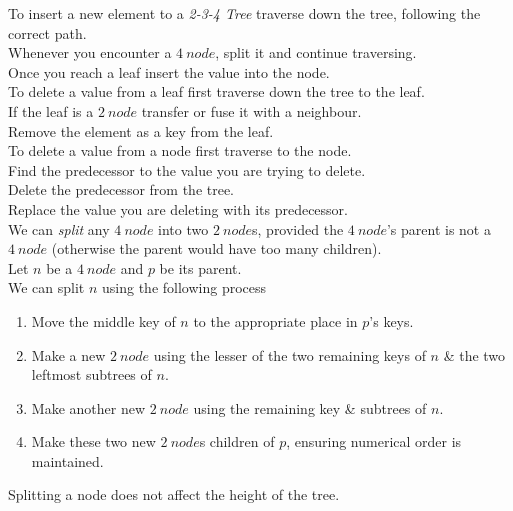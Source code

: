 \documentclass[11pt,a4paper]{article}
\begin{document}
To insert a new element to a \textit{2-3-4 Tree} traverse down the tree, following the correct path.\\
Whenever you encounter a $4\ node$, split it and continue traversing.\\
Once you reach a leaf insert the value into the node.\\

To delete a value from a leaf first traverse down the tree to the leaf.\\
If the leaf is a $2\ node$ transfer or fuse it with a neighbour.\\
Remove the element as a key from the leaf.\\

To delete a value from a node first traverse to the node.\\
Find the predecessor to the value you are trying to delete.\\
Delete the predecessor from the tree.\\
Replace the value you are deleting with its predecessor.\\

We can \textit{split} any $4\ node$ into two $2\ node$s, provided the $4\ node$'s parent is not a $4\ node$ (otherwise the parent would have too many children).\\
Let $n$ be a $4\ node$ and $p$ be its parent.\\
We can split $n$ using the following process
\begin{enumerate}
  \item Move the middle key of $n$ to the appropriate place in $p$'s keys.
  \item Make a new $2\ node$ using the lesser of the two remaining keys of $n$ \& the two leftmost subtrees of $n$.
  \item Make another new $2\ node$ using the remaining key \& subtrees of $n$.
  \item Make these two new $2\ node$s children of $p$, ensuring numerical order is maintained.
\end{enumerate}
\nb Splitting a node does not affect the height of the tree.\\
\end{document}
